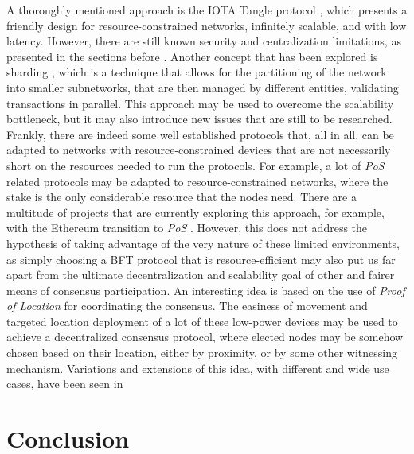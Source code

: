 \documentclass[journal]{IEEEtran}
\begin{document}
A thoroughly mentioned approach is the IOTA Tangle protocol \cite{popov2018tangle}, which
presents a friendly design for resource-constrained networks, infinitely scalable, and with low latency.
However, there are still known security and centralization limitations, as presented in the sections before \cite{8168250}.
Another concept that has been explored is sharding \cite{SALIMITARI2020100212, queralta2021blockchain}, which is a
technique that allows for the partitioning of the network into smaller subnetworks,
that are then managed by different entities, validating transactions in parallel. 
This approach may be used to overcome the scalability bottleneck,
but it may also introduce new issues that are still to be researched.
Frankly, there are indeed some well established protocols that, all in all, can be adapted to networks with
resource-constrained devices that are not necessarily short on the resources needed to run the protocols.
For example, a lot of \emph{PoS} related protocols may be adapted to resource-constrained networks, where 
the stake is the only considerable resource that the nodes need. There are a multitude of projects that are
currently exploring this approach, for example, with the Ethereum transition to \emph{PoS} \cite{buterin2017casper}.
However, this does not address the hypothesis of taking advantage of the very nature of these limited environments, 
as simply choosing a BFT protocol that is resource-efficient
may also put us far apart from the ultimate decentralization and scalability goal of 
other and fairer means of consensus participation.
An interesting idea is based on the use of \emph{Proof of Location} for 
coordinating the consensus. The easiness of movement and targeted location deployment
of a lot of these low-power devices may be used to achieve a decentralized consensus
protocol, where elected nodes may be somehow chosen based on their location, 
either by proximity, or by some other witnessing mechanism. Variations and 
extensions of this idea, with different and wide use cases, have been seen in
\cite{foam2018location, xyo2018location}

\section{Conclusion}
\end{document}
